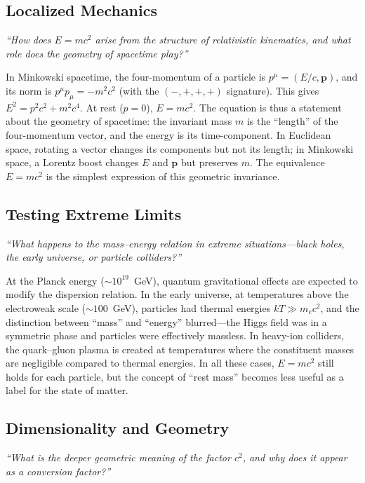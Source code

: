 \documentclass[11pt,openright]{book}
\begin{document}
\subsection*{Localized Mechanics}
\textit{``How does $E = mc^{2}$ arise from the structure of relativistic kinematics, and what role does the geometry of spacetime play?''}

In Minkowski spacetime, the four-momentum of a particle is $p^{\mu} = (E/c, \mathbf{p})$, and its norm is $p^{\mu}p_{\mu} = -m^{2}c^{2}$ (with the $(-,+,+,+)$ signature). This gives $E^{2} = p^{2}c^{2} + m^{2}c^{4}$. At rest ($p = 0$), $E = mc^{2}$. The equation is thus a statement about the geometry of spacetime: the invariant mass $m$ is the ``length'' of the four-momentum vector, and the energy is its time-component. In Euclidean space, rotating a vector changes its components but not its length; in Minkowski space, a Lorentz boost changes $E$ and $\mathbf{p}$ but preserves $m$. The equivalence $E = mc^{2}$ is the simplest expression of this geometric invariance.

\subsection*{Testing Extreme Limits}
\textit{``What happens to the mass--energy relation in extreme situations---black holes, the early universe, or particle colliders?''}

At the Planck energy ($\sim 10^{19}$~GeV), quantum gravitational effects are expected to modify the dispersion relation. In the early universe, at temperatures above the electroweak scale ($\sim 100$~GeV), particles had thermal energies $kT \gg m_{e}c^{2}$, and the distinction between ``mass'' and ``energy'' blurred---the Higgs field was in a symmetric phase and particles were effectively massless. In heavy-ion colliders, the quark--gluon plasma is created at temperatures where the constituent masses are negligible compared to thermal energies. In all these cases, $E = mc^{2}$ still holds for each particle, but the concept of ``rest mass'' becomes less useful as a label for the state of matter.

\subsection*{Dimensionality and Geometry}
\textit{``What is the deeper geometric meaning of the factor $c^{2}$, and why does it appear as a conversion factor?''}
\end{document}

